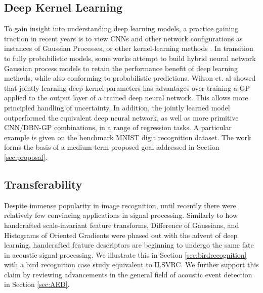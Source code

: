 \documentclass[12pt]{llncs}
\begin{document}
\subsection{Deep Kernel Learning}
To gain insight into understanding deep learning models, a practice gaining traction in recent years is to view CNNs and other network configurations as instances of Gaussian Processes, or other kernel-learning methods \cite{duvenaud2014automatic}. In transition to fully probabilistic models, some works attempt to build hybrid neural network Gaussian process models to retain the performance benefit of deep learning methods, while also conforming to probabilistic predictions. Wilson et. al \cite{wilson2016deep} showed that jointly learning deep kernel parameters has advantages over training a GP applied to the output layer of a trained deep neural network. This allows more principled handling of uncertainty. In addition, the jointly learned model outperformed the equivalent deep neural network, as well as more primitive CNN/DBN-GP combinations, in a range of regression tasks. A particular example is given on the benchmark MNIST digit recognition dataset. The work forms the basis of a medium-term proposed goal addressed in Section \ref{sec:proposal}.


\subsection{Transferability}
Despite immense popularity in image recognition, until recently there were relatively few convincing applications in signal processing. Similarly to how handcrafted scale-invariant feature transforms, Difference of Gaussians, and Histograms of Oriented Gradients \cite{lowe1999object,dalal2005histograms} were phased out with the advent of deep learning, handcrafted feature descriptors are beginning to undergo the same fate in acoustic signal processing. We illustrate this in Section \ref{sec:birdrecognition} with a bird recognition case study equivalent to ILSVRC. We further support this claim by reviewing advancements in the general field of acoustic event detection in Section \ref{sec:AED}.
\end{document}
